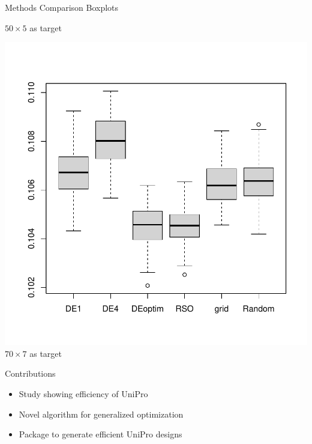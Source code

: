\documentclass{beamer}
\begin{document}
\begin{frame}{Methods Comparison Boxplots}
\begin{minipage}{0.32\textwidth}
   \small{$50\times 5$ as target}
\end{minipage}
\begin{minipage}{0.32\textwidth}
   \centering
   \includegraphics[]{../chapters/RSO/pdfs/boxplots4}
   \small{$70\times 7$ as target}
\end{minipage}
\end{frame}


\begin{frame}{Contributions}
\begin{itemize}
  \item Study showing efficiency of UniPro
  \item Novel algorithm for generalized optimization
  \item Package to generate efficient UniPro designs
\end{itemize}
\end{frame}

\end{document}
